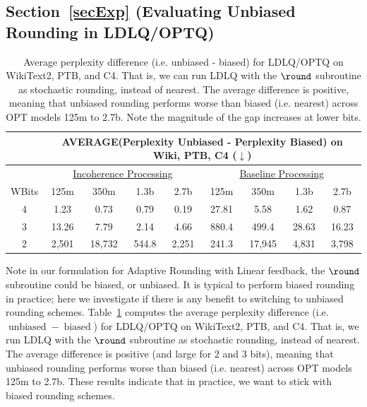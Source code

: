 \subsection{Section~\ref{secExp} (Evaluating Unbiased Rounding in LDLQ/OPTQ)}
\begin{table}[h!]
\centering
\begin{tabular}{c|cccc|cccc}
& \multicolumn{8}{c}{AVERAGE(Perplexity Unbiased - Perplexity Biased) on Wiki, PTB, C4 ($\downarrow$)}\Bstrut \\
\hline
& \multicolumn{4}{c}{\underline{Incoherence Processing}} &
\multicolumn{4}{c}{\underline{Baseline Processing}}\Tstrut\Bstrut \\
WBits\Tstrut\Bstrut & 125m & 350m & 1.3b & 2.7b & 125m & 350m & 1.3b & 2.7b \\
\hline
4\Tstrut &
1.23 & 0.73 & 0.79 & 0.19 & 27.81 & 5.58 & 1.62 & 0.87
\\
3 &
13.26 & 7.79 & 2.14 & 4.66 & 880.4 & 499.4 & 28.63 & 16.23
\\
2\Bstrut & 
2,501 & 18,732 & 544.8 & 2,251 & 241.3 & 17,945 & 4,831 & 3,798
\\
\end{tabular}
\caption{
Average perplexity difference (i.e. unbiased - biased) for LDLQ/OPTQ on WikiText2, PTB, and C4.
That is, we can run LDLQ with the $\round$ subroutine as stochastic rounding, instead of nearest.
The average difference is positive, meaning that unbiased rounding performs worse than biased (i.e. nearest) across OPT models 125m to 2.7b.
Note the magnitude of the gap increases at lower bits.
}
\label{tabSuppUnbiased}
\end{table}

Note in our formulation for Adaptive Rounding with Linear feedback, the $\round$ subroutine could be biased, or unbiased.
It is typical to perform biased rounding in practice; here we investigate if there is any benefit to switching to unbiased rounding schemes.
Table~\ref{tabSuppUnbiased} computes the average perplexity difference (i.e. $\operatorname{unbiased} - \operatorname{biased}$) for LDLQ/OPTQ on WikiText2, PTB, and C4.
That is, we run LDLQ with the $\round$ subroutine as stochastic rounding, instead of nearest.
The average difference is positive (and large for 2 and 3 bits), meaning that unbiased rounding performs worse than biased (i.e. nearest) across OPT models 125m to 2.7b.
These results indicate that in practice, we want to stick with biased rounding schemes.

